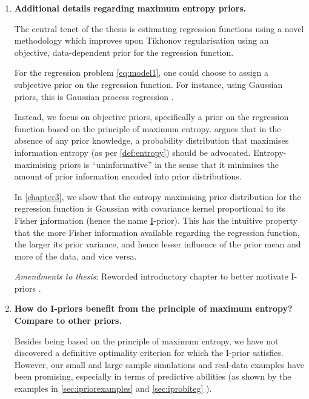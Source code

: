 \documentclass[11pt,openright,twoside]{report}
\begin{document}
\begin{enumerate}
  \item \textbf{Additional details regarding maximum entropy priors.}
  
  The central tenet of the thesis is estimating regression functions using a novel methodology which improves upon Tikhonov regularisation using an objective, data-dependent prior for the regression function.
  
  For the regression problem \cref{eq:model1}, one could choose to assign a subjective prior on the regression function.
  For instance, using Gaussian priors, this is Gaussian process regression \citep{rasmussen2006gaussian}.
  
  Instead, we focus on objective priors, specifically a prior on the regression function based on the principle of maximum entropy.
  \citet{jaynes1957a,jaynes1957b,jaynes2003probability} argues that in the absence of any prior knowledge, a probability distribution that maximises information entropy (as per \cref{def:entropy}) should be advocated.
  Entropy-maximising priors is ``uninformative'' in the sense that it minimises the amount of prior information encoded into prior distributions.
  
  In \cref{chapter3}, we show that the entropy maximising prior distribution for the regression function is Gaussian with covariance kernel proportional to its Fisher \underline{i}nformation (hence the name \underline{I}-prior).
  This has the intuitive property that the more Fisher information available regarding the regression function, the larger its prior variance, and hence lesser influence of the prior mean and more of the data, and vice versa.
  
  \textit{Amendments to thesis}: Reworded introductory chapter to better motivate I-priors .
    
  \item \textbf{How do I-priors benefit from the principle of maximum entropy? Compare to other priors.}
  
  Besides being based on the principle of maximum entropy, we have not discovered a definitive optimality criterion for which the I-prior satisfies.
  However, our small and large sample simulations and real-data examples have been promising, especially in terms of predictive abilities (as shown by the examples in \cref{sec:ipriorexamples}  and \cref{sec:iprobiteg} ).
  

\end{enumerate}
\end{document}
